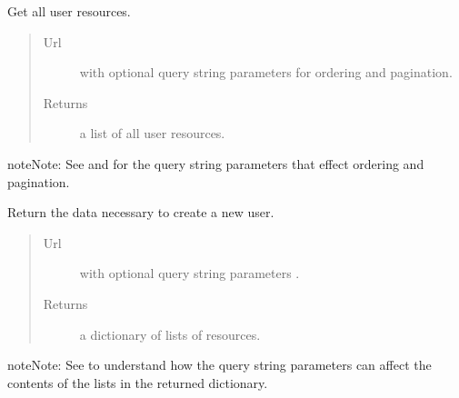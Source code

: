 \documentclass[letterpaper,10pt,english]{sphinxmanual}
\begin{document}
\begin{fulllineitems}

\begin{fulllineitems}
\label{api:onlinelinguisticdatabase.controllers.users.UsersController.index}
Get all user resources.
\begin{quote}\begin{description}
\item[{Url }] \leavevmode
{} with optional query string parameters for
ordering and pagination.

\item[{Returns}] \leavevmode
a list of all user resources.

\end{description}\end{quote}

\begin{notice}{note}{Note:}
See  and  for the
query string parameters that effect ordering and pagination.
\end{notice}

\end{fulllineitems}


\begin{fulllineitems}
\label{api:onlinelinguisticdatabase.controllers.users.UsersController.new}
Return the data necessary to create a new user.
\begin{quote}\begin{description}
\item[{Url }] \leavevmode
{} with optional query string parameters .

\item[{Returns}] \leavevmode
a dictionary of lists of resources.

\end{description}\end{quote}

\begin{notice}{note}{Note:}
See  to understand how the query string
parameters can affect the contents of the lists in the returned
dictionary.
\end{notice}

\end{fulllineitems}


\end{fulllineitems}
\end{document}
